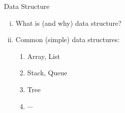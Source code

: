 \begin{frame}{}
  \begin{center}
    {\LARGE Data Structure} \\[0.60cm]
  \end{center}

  \begin{enumerate}[(i)]
    \setlength{\itemsep}{8pt}
    \item {\large What is (and why) data structure?}
    \item {\large Common (simple) data structures:}
      \begin{enumerate}[(1)]
	\setlength{\itemsep}{4pt}
	\item Array, List
	\item Stack, Queue
	\item Tree
	\item $\cdots$
      \end{enumerate}
  \end{enumerate}
\end{frame}

